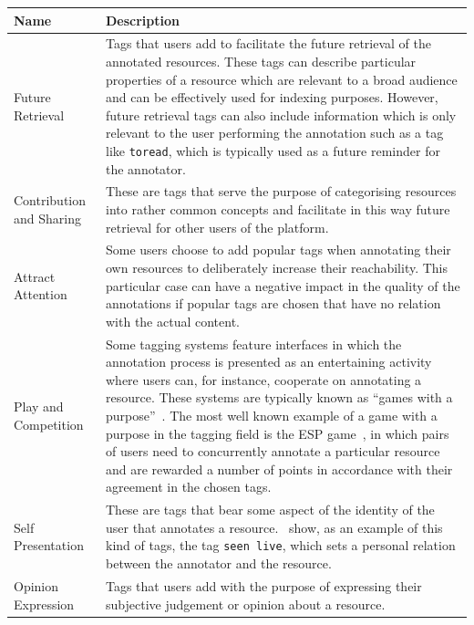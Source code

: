 \begin{table}[p]
\begin{threeparttable}
\centering
{}
\footnotesize
\begin{tabular}{@{}lp{9cm}@{}} \toprule
\textbf{Name} & \textbf{Description}  \\ 
\midrule 

Future Retrieval & Tags that users add to facilitate the future retrieval of the annotated resources. These tags can describe particular properties of a resource which are relevant to a broad audience and can be effectively used for indexing purposes. However, future retrieval tags can also include information which is only relevant to the user performing the annotation such as a tag like \texttt{toread}, which is typically used as a future reminder for the annotator. \\

Contribution and Sharing & These are tags that serve the purpose of categorising resources into rather common concepts and facilitate in this way future retrieval for other users of the platform. \\

Attract Attention & Some users choose to add popular tags when annotating their own resources to deliberately increase their reachability. This particular case can have a negative impact in the quality of the annotations if popular tags are chosen that have no relation with the actual content. \\

Play and Competition & Some tagging systems feature interfaces in which the annotation process is presented as an entertaining activity where users can, for instance, cooperate on annotating a resource. These systems are typically known as ``games with a purpose''~\citep{Ahn2006}. The most well known example of a game with a purpose in the tagging field is the ESP game~\citep{VonAhn2004}, in which pairs of users need to concurrently annotate a particular resource and are rewarded a number of points in accordance with their agreement in the chosen tags. \\

Self Presentation & These are tags that bear some aspect of the identity of the user that annotates a resource.~\cite{marlow2006} show, as an example of this kind of tags, the tag \texttt{seen live}, which sets a personal relation between the annotator and the resource. \\

Opinion Expression & Tags that users add with the purpose of expressing their subjective judgement or opinion about a resource. \\


\end{tabular}
\end{threeparttable}
\end{table}
